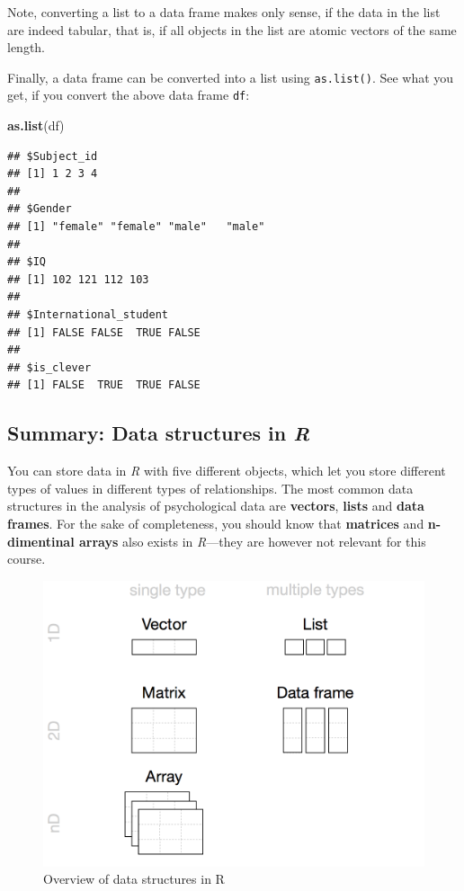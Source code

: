 \documentclass[
]{scrartcl}
\newenvironment{Shaded}{\begin{snugshade}}{\end{snugshade}}
\newcommand{\FunctionTok}[1]{\textcolor[rgb]{0.13,0.29,0.53}{\textbf{#1}}}
\newcommand{\NormalTok}[1]{#1}
\begin{document}
Note, converting a list to a data frame makes only sense, if the data in the list are indeed tabular, that is, if all objects in the list are atomic vectors of the same length.

Finally, a data frame can be converted into a list using \texttt{as.list()}. See what you get, if you convert the above data frame \texttt{df}:

\begin{Shaded}
\begin{Highlighting}[]
\FunctionTok{as.list}\NormalTok{(df)}
\end{Highlighting}
\end{Shaded}

\begin{verbatim}
## $Subject_id
## [1] 1 2 3 4
## 
## $Gender
## [1] "female" "female" "male"   "male"  
## 
## $IQ
## [1] 102 121 112 103
## 
## $International_student
## [1] FALSE FALSE  TRUE FALSE
## 
## $is_clever
## [1] FALSE  TRUE  TRUE FALSE
\end{verbatim}

\hypertarget{summary-data-structures-in-r}{%
\subsection{\texorpdfstring{Summary: Data structures in \emph{R}}{Summary: Data structures in R}}\label{summary-data-structures-in-r}}

You can store data in \emph{R} with five different objects, which let you store different types of values in different types of relationships. The most common data structures in the analysis of psychological data are \textbf{vectors}, \textbf{lists} and \textbf{data frames}. For the sake of completeness, you should know that \textbf{matrices} and \textbf{n-dimentinal arrays} also exists in \emph{R}---they are however not relevant for this course.

\begin{figure}
\includegraphics[width=650px]{images/r_data_types} \caption{Overview of data structures in R}\label{fig:unnamed-chunk-127}
\end{figure}
\end{document}
